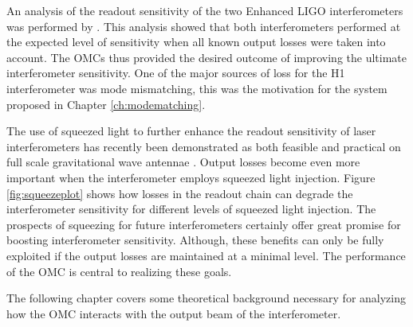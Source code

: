 An analysis of the readout sensitivity of the two Enhanced LIGO interferometers was performed by \citet{Tobin}. %
This analysis showed that both interferometers performed at the expected level of sensitivity when all known output losses were taken into account. %
The OMCs thus provided the desired outcome of improving the ultimate interferometer sensitivity. %
One of the major sources of loss for the H1 interferometer was mode mismatching, this was the motivation for the system proposed in Chapter \ref{ch:modematching}.

The use of squeezed light to further enhance the readout sensitivity of laser interferometers has recently been demonstrated as both feasible and practical on full scale gravitational wave antennae \cite{GEOSqz:11,LIGOSqz}. %
Output losses become even more important when the interferometer employs squeezed light injection. %
Figure \ref{fig:squeezeplot} shows how losses in the readout chain can degrade the interferometer sensitivity for different levels of squeezed light injection. %
The prospects of squeezing for future interferometers certainly offer great promise for boosting interferometer sensitivity. %
Although, these benefits can only be fully exploited if the output losses are maintained at a minimal level. %
The performance of the OMC is central to realizing these goals.

The following chapter covers some theoretical background necessary for analyzing how the OMC interacts with the output beam of the interferometer.
